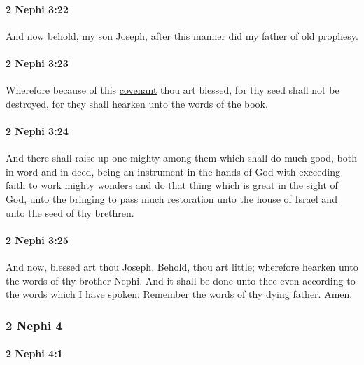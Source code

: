 		\paragraph{2 Nephi 3:22} %
			\label{2NEPHI-3-22}

			And now behold, my son Joseph,
			after this manner did my father of old prophesy.

		\paragraph{2 Nephi 3:23} %
			\label{2NEPHI-3-23}

			Wherefore because of this \hyperref[COVENANT]{covenant} thou art blessed,
			for thy seed shall not be destroyed,
			for they shall hearken unto the words of the book.

		\paragraph{2 Nephi 3:24} %
			\label{2NEPHI-3-24}

			And there shall raise up one mighty among them
			which shall do much good, both in word and in deed,
			being an instrument in the hands of God
			with exceeding faith to work mighty wonders
			and do that thing which is great in the sight of God,
			unto the bringing to pass much restoration
			unto the house of Israel and unto the seed of thy brethren.

		\paragraph{2 Nephi 3:25} %
			\label{2NEPHI-3-25}

			And now, blessed art thou Joseph.
			Behold, thou art little;
			wherefore hearken unto the words of thy brother Nephi.
			And it shall be done unto thee
			even according to the words which I have spoken.
			Remember the words of thy dying father.
			Amen.

	\subsubsection{2 Nephi 4} %
		\label{2NEPHI-4}
		
		\paragraph{2 Nephi 4:1} %
			\label{2NEPHI-4-1}

